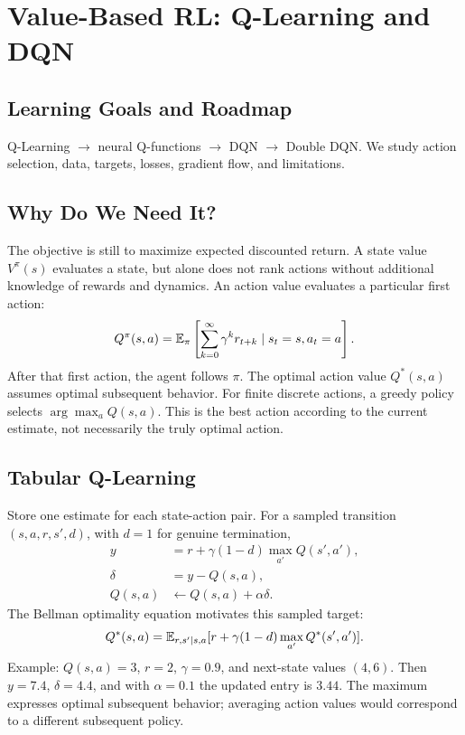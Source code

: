 \chapter{Value-Based RL: Q-Learning and DQN}
\section{Learning Goals and Roadmap}
Q-Learning $\rightarrow$ neural Q-functions $\rightarrow$ DQN
$\rightarrow$ Double DQN. We study action selection, data, targets,
losses, gradient flow, and limitations.

\section{Why Do We Need It?}
The objective is still to maximize expected discounted return.
A state value $V^\pi(s)$ evaluates a state, but alone does not rank
actions without additional knowledge of rewards and dynamics.
An action value evaluates a particular first action:
\begin{equation}
Q^\pi(s,a)=\mathbb{E}_\pi\left[\sum_{k=0}^{\infty}\gamma^k r_{t+k}
\mid s_t=s,a_t=a\right].
\end{equation}
After that first action, the agent follows $\pi$. The optimal
action value $Q^*(s,a)$ assumes optimal subsequent behavior.
For finite discrete actions, a greedy policy selects
$\arg\max_a Q(s,a)$. This is the best action according to the
current estimate, not necessarily the truly optimal action.

\section{Tabular Q-Learning}
Store one estimate for each state-action pair. For a sampled
transition $(s,a,r,s',d)$, with $d=1$ for genuine termination,
\begin{align}
y &= r+\gamma(1-d)\max_{a'}Q(s',a'),\\
\delta &= y-Q(s,a),\\
Q(s,a)&\leftarrow Q(s,a)+\alpha\delta.
\end{align}
The Bellman optimality equation motivates this sampled target:
\begin{equation}
Q^*(s,a)=\mathbb{E}_{r,s'\mid s,a}
[r+\gamma(1-d)\max_{a'}Q^*(s',a')].
\end{equation}
Example: $Q(s,a)=3$, $r=2$, $\gamma=0.9$, and next-state
values $(4,6)$. Then $y=7.4$, $\delta=4.4$, and with
$\alpha=0.1$ the updated entry is $3.44$.
The maximum expresses optimal subsequent behavior; averaging
action values would correspond to a different subsequent policy.

